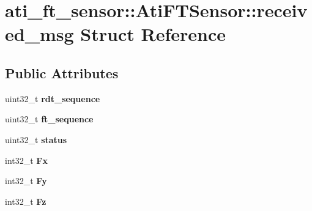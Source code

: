 \hypertarget{structati__ft__sensor_1_1AtiFTSensor_1_1received__msg}{}\section{ati\+\_\+ft\+\_\+sensor\+:\+:Ati\+F\+T\+Sensor\+:\+:received\+\_\+msg Struct Reference}
\label{structati__ft__sensor_1_1AtiFTSensor_1_1received__msg}
\subsection*{Public Attributes}
\begin{DoxyCompactItemize}
\item 
\mbox{\label{structati__ft__sensor_1_1AtiFTSensor_1_1received__msg_a6ddf19c84eee306ce762505c6c2cb443}} 
uint32\+\_\+t {\bfseries rdt\+\_\+sequence}
\item 
\mbox{\label{structati__ft__sensor_1_1AtiFTSensor_1_1received__msg_a1c78752981a5fb93759c9f77a06934cd}} 
uint32\+\_\+t {\bfseries ft\+\_\+sequence}
\item 
\mbox{\label{structati__ft__sensor_1_1AtiFTSensor_1_1received__msg_ab0feca418ea50b28924b94610e5adf9a}} 
uint32\+\_\+t {\bfseries status}
\item 
\mbox{\label{structati__ft__sensor_1_1AtiFTSensor_1_1received__msg_a1d3bd277f5c758c35059b3b8b7304798}} 
int32\+\_\+t {\bfseries Fx}
\item 
\mbox{\label{structati__ft__sensor_1_1AtiFTSensor_1_1received__msg_aa5608c692132d39d129b59c396d42ae7}} 
int32\+\_\+t {\bfseries Fy}
\item 
\mbox{\label{structati__ft__sensor_1_1AtiFTSensor_1_1received__msg_af0b5bc2426ff22e4171653b22ac35532}} 
int32\+\_\+t {\bfseries Fz}
\item 
\mbox{\label{structati__ft__sensor_1_1AtiFTSensor_1_1received__msg_a855dd741933afd6f75781246f32e3101}} 

\end{DoxyCompactItemize}
